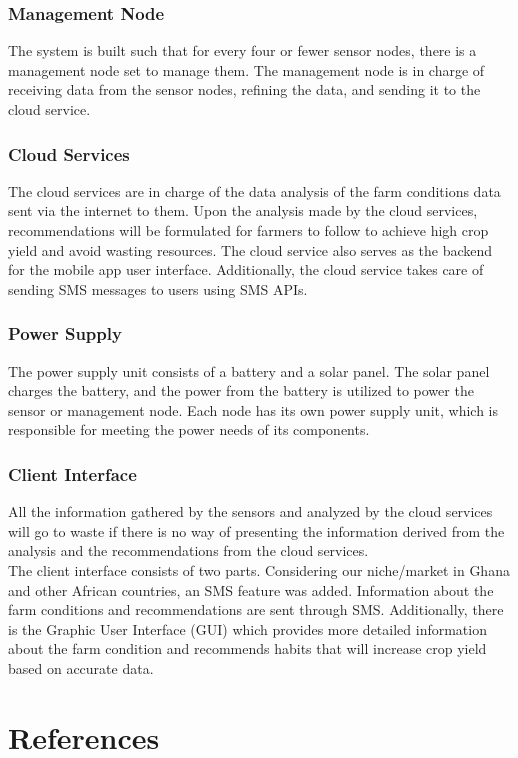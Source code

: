 \documentclass[12pt, a4paper]{article}
\begin{document}
\subsubsection{Management Node}
The system is built such that for every four or fewer sensor nodes, there is a management node set to manage them. The management node is in charge of receiving data from the sensor nodes, refining the data, and sending it to the cloud service.

\subsubsection{Cloud Services}
The cloud services are in charge of the data analysis of the farm conditions data sent via the internet to them. Upon the analysis made by the cloud services, recommendations will be formulated for farmers to follow to achieve high crop yield and avoid wasting resources. The cloud service also serves as the backend for the mobile app user interface. Additionally, the cloud service takes care of sending SMS messages to users using SMS APIs.

\subsubsection{Power Supply}
The power supply unit consists of a battery and a solar panel. The solar panel charges the battery, and the power from the battery is utilized to power the sensor or management node. Each node has its own power supply unit, which is responsible for meeting the power needs of its components.

\subsubsection{Client Interface}
All the information gathered by the sensors and analyzed by the cloud services will go to waste if there is no way of presenting the information derived from the analysis and the recommendations from the cloud services.\\

The client interface consists of two parts. Considering our niche/market in Ghana and other African countries, an SMS feature was added. Information about the farm conditions and recommendations are sent through SMS. Additionally, there is the Graphic User Interface (GUI) which provides more detailed information about the farm condition and recommends habits that will increase crop yield based on accurate data.
\newpage

\section{References}


\end{document}
